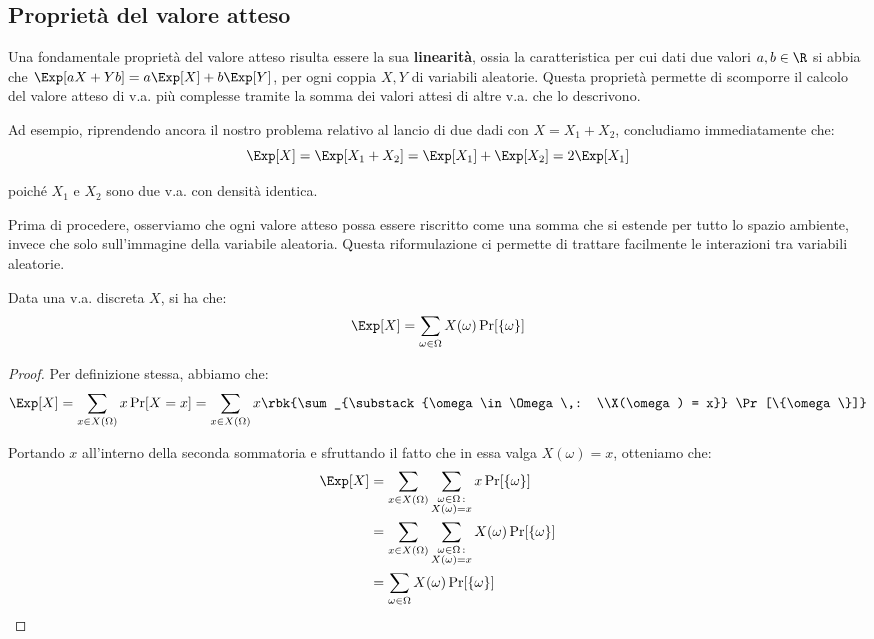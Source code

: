 \documentclass[a4paper, 12pt]{report}
\begin{document}
    \subsection{Proprietà del valore atteso}

    Una fondamentale proprietà del valore atteso risulta essere la sua \textbf{linearità}, ossia la caratteristica per cui dati due valori $a,b \in \R$ si abbia che $\Exp[aX + Yb] = a \Exp[X]+b\Exp[Y]$, per ogni coppia $X,Y$ di variabili aleatorie. Questa proprietà permette di scomporre il calcolo del valore atteso di v.a. più complesse tramite la somma dei valori attesi di altre v.a. che lo descrivono.
    
    Ad esempio, riprendendo ancora il nostro problema relativo al lancio di due dadi con $X = X_1 + X_2$, concludiamo immediatamente che:
    \[\Exp[X] = \Exp[X_1 + X_2] = \Exp[X_1] + \Exp[X_2] = 2 \Exp[X_1]\] 

    poiché $X_1$ e $X_2$ sono due v.a. con densità identica.

    Prima di procedere, osserviamo che ogni valore atteso possa essere riscritto come una somma che si estende per tutto lo spazio ambiente, invece che solo sull'immagine della variabile aleatoria. Questa riformulazione ci permette di trattare facilmente le interazioni tra variabili aleatorie.

    \begin{framedlem}{}
        Data una v.a. discreta $X$, si ha che:
        \[\Exp[X] = \sum_{\omega \in \Omega} X(\omega) \Pr[\{\omega\}] \]
    \end{framedlem}

    \begin{proof}
        Per definizione stessa, abbiamo che:
        \[\Exp[X] = \sum_{x \in X(\Omega)} x \Pr[X = x] = \sum_{x \in X(\Omega)} x \rbk{\sum_{\substack{\omega \in \Omega \,: \\X(\omega) = x}} \Pr[\{\omega\}]}\]

        Portando $x$ all'interno della seconda sommatoria e sfruttando il fatto che in essa valga $X(\omega) = x$, otteniamo che:
        \[\begin{split}
            \Exp[X] &= \sum_{x \in X(\Omega)} \sum_{\substack{\omega \in \Omega \,: \\X(\omega) = x}} x \Pr[\{\omega\}] \\
            &= \sum_{x \in X(\Omega)} \sum_{\substack{\omega \in \Omega \,: \\X(\omega) = x}} X(\omega) \Pr[\{\omega\}] \\
            &=\sum_{\omega \in \Omega} X(\omega) \Pr[\{\omega\}]
        \end{split}\]
    \end{proof}
\end{document}
